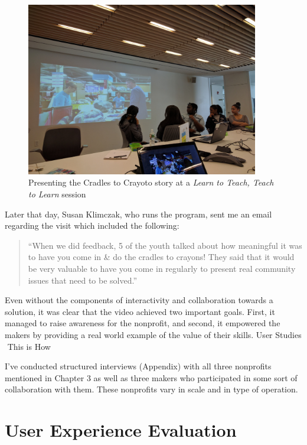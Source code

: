   \begin{figure}[thpb]
      \centering
      \includegraphics[width=4in]{figures/learn2teach.jpg}
      \caption{Presenting the Cradles to Crayoto story at a \textit{Learn to Teach, Teach to Learn} session}
      \label{fig_setc}
   \end{figure}

Later that day, Susan Klimczak, who runs the program, sent me an email regarding the visit which included the following:

\begin{quotation}

``When we did feedback, 5 of the youth talked about how meaningful it was to have you come in \& do the cradles to crayons! They said that it would be very valuable to have you come in regularly to present real community issues that need to be solved.''

\end{quotation}

Even without the components of interactivity and collaboration towards a solution, it was clear that the video achieved two important goals. First, it managed to raise awareness for the nonprofit, and second, it empowered the makers by providing a real world example of the value of their skills.
User Studies ­ This is How

I've conducted structured interviews (Appendix) with all three nonprofits mentioned in Chapter 3 as well as three makers who participated in some sort of collaboration with them. These nonprofits vary in scale and in type of operation.

\section{User Experience Evaluation}

